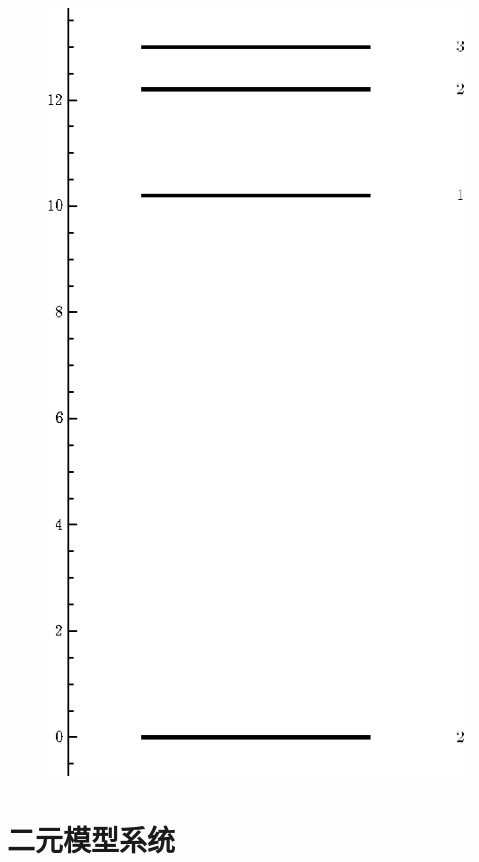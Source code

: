 \begin{figure}[ht]
    \centering %
    \scalebox{0.8} %
    {\includegraphics{chapters/ch1/11.eps}} %
    \label{fig:11} %
   \end{figure}

\section{二元模型系统}